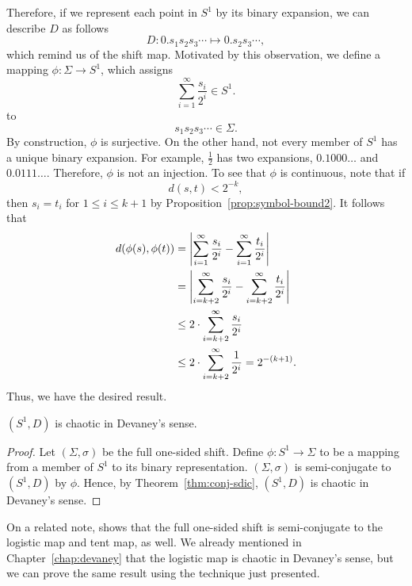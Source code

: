 \documentclass[10pt,twoside]{book}
\begin{document}
Therefore, if we represent each point in $S^1$ by its binary expansion, we can describe $D$ as follows
\begin{equation*}
  D: 0.s_1 s_2 s_3 \cdots \mapsto 0.s_2 s_3 \cdots,
\end{equation*}
which remind us of the shift map.
Motivated by this observation, we define a mapping $\phi: \Sigma \to S^1$, which assigns
\begin{equation*}
  \sum\limits_{i = 1}^{\infty} \frac{s_i}{2^i} \in S^1.
\end{equation*}
to
\begin{equation*}
  s_1 s_2 s_3 \cdots \in \Sigma.
\end{equation*}
By construction, $\phi$ is surjective.
On the other hand, not every member of $S^1$ has a unique binary expansion. 
For example, $\frac{1}{2}$ has two expansions, $0.1000\ldots$ and $0.0111\ldots$.
Therefore, $\phi$ is not an injection.
To see that $\phi$ is continuous, note that if
\begin{equation*}
  d(s,t) < 2^{-k},
\end{equation*}
then $s_i = t_i$ for $1 \leq i \leq k+1$ by Proposition~\ref{prop:symbol-bound2}.
It follows that
\begin{align*}
  d(\phi(s), \phi(t))
  &= \left |  \sum\limits_{i=1}^{\infty} \frac{s_i}{2^i} - \sum\limits_{i=1}^{\infty} \frac{t_i}{2^i}  \right | \\
  &= \left |  \sum\limits_{i=k+2}^{\infty} \frac{s_i}{2^i} - \sum\limits_{i=k+2}^{\infty} \frac{t_i}{2^i}  \right | \\
  &\leq 2 \cdot \sum\limits_{i=k+2}^{\infty} \frac{s_i}{2^i}  \\
  &\leq 2 \cdot \sum\limits_{i=k+2}^{\infty} \frac{1}{2^i}
  = 2^{-(k+1)}.
\end{align*}
Thus, we have the desired result.
\begin{theorem}
  $(S^1, D)$ is chaotic in Devaney's sense.
  \begin{proof}
    Let $(\Sigma, \sigma)$ be the full one-sided shift.
    Define $\phi: S^1 \to \Sigma$ to be a mapping from a member of $S^1$ to its binary representation.
    $(\Sigma, \sigma)$ is semi-conjugate to $(S^1, D)$ by $\phi$.
    Hence, by Theorem~\ref{thm:conj-sdic}, $(S^1, D)$ is chaotic in Devaney's sense.
  \end{proof}
\end{theorem}
On a related note, \citet[Chap.4]{sternberg} shows that the full one-sided shift is semi-conjugate to the logistic map and tent map, as well.
We already mentioned in Chapter~\ref{chap:devaney} that the logistic map is chaotic in Devaney's sense, but we can prove the same result using the technique just presented.
\end{document}
